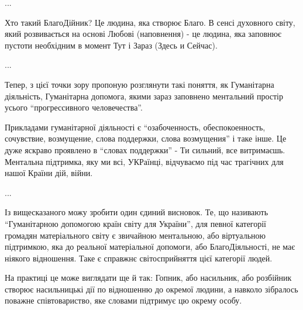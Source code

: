 ...

Хто такий БлагоДійник? Це людина, яка створює Благо. В сенсі духовного світу,
який розвивається на основі Любові (наповнення) - це людина, яка заповнює
пустоти необхідним в момент Тут і Зараз (Здесь и Сейчас). 

...

Тепер, з цієї точки зору пропоную розглянути такі поняття, як Гуманітарна
діяльність, Гуманітарна допомога, якими зараз заповнено ментальний простір
усього \enquote{прогрессивного человечества}. 

Прикладами гуманітарної діяльності  є \enquote{озабоченность, обеспокоенность,
сочувствие, возмущение, слова поддержки, слова возмущения} і таке інше. Це дуже
яскраво проявлено в \enquote{словах поддержки} - Ти сильний, все витримаєшь. Ментальна
підтримка, яку ми всі, УКРаїнці, відчуваємо під час трагічних для нашої Країни
дій, війни.

...

Із вищесказаного можу зробити один єдиний висновок. Те, що називають
\enquote{Гуманітарною допомогою країн світу для України}, для певної категорії
громадян матеріального світу є звичайною ментальною, або віртуальною
підтримкою, яка до реальної матеріальної допомоги, або БлагоДіяльності, не має
ніякого відношення.  Таке є справжнє світосприйняття цієї категорії людей. 

На практиці це може виглядати ще й так: Гопник, або насильник, або розбійник
створює насильницькі дії по відношенню до окремої людини, а навколо зібралось
поважне співтовариство, яке словами підтримує цю окрему особу.
